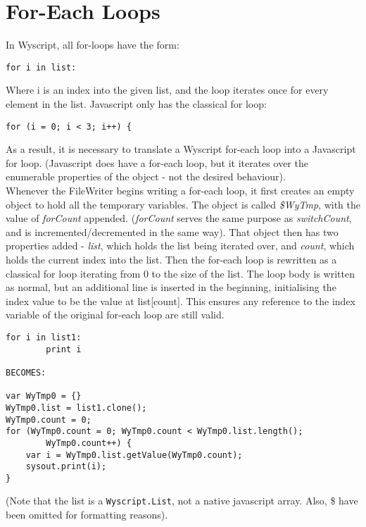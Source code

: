 
\section{For-Each Loops}
\label{c_control_foreach}

In Wyscript, all for-loops have the form:
\begin{lstlisting}
for i in list:
\end{lstlisting}
Where i is an index into the given list, and the loop iterates once for every element in the list. Javascript only has the classical for loop:
\begin{lstlisting}
for (i = 0; i < 3; i++) {
\end{lstlisting}
As a result, it is necessary to translate a Wyscript for-each loop into a Javascript for loop. (Javascript does have a for-each loop, but it iterates over the enumerable properties of the object - not the desired behaviour).\\

Whenever the FileWriter begins writing a for-each loop, it first creates an empty object to hold all the temporary variables. The object is called {\em \$WyTmp}, with the value of {\em forCount} appended. ({\em forCount} serves the same purpose as {\em switchCount}, and is incremented/decremented in the same way). That object then has two properties added - {\em list}, which holds the list being iterated over, and {\em count}, which holds the current index into the list. Then the for-each loop is rewritten as a classical for loop iterating from 0 to the size of the list. The loop body is written as normal, but an additional line is inserted in the beginning, initialising the index value to be the value at list[count]. This ensures any reference to the index variable of the original for-each loop are still valid. \pagebreak

\begin{lstlisting}
for i in list1:
        print i

BECOMES:

var WyTmp0 = {}
WyTmp0.list = list1.clone();
WyTmp0.count = 0;
for (WyTmp0.count = 0; WyTmp0.count < WyTmp0.list.length();
        WyTmp0.count++) {
    var i = WyTmp0.list.getValue(WyTmp0.count);
    sysout.print(i);
}
\end{lstlisting}
(Note that the list is a \lstinline{Wyscript.List}, not a native javascript array. Also, \$ have been omitted for formatting reasons).
